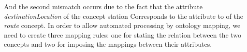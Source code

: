 \documentclass[a4paper]{article}
\begin{document}
And the second mismatch occurs due to the fact that the attribute
{\em destinationLocation} of the concept station Corresponds to
the attribute to of the {\em route} concept. In order to allow automated processing
by ontology mapping, we need to create three mapping rules: one for stating
the relation between the two concepts and two for imposing the mappings between
their attributes.
\end{document}
